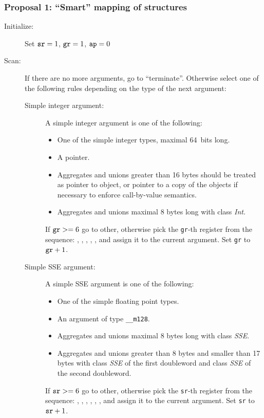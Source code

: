 \subsubsection {Proposal 1: ``Smart'' mapping of structures}

\begin{description}
  \item[Initialize:]
    Set $\verb|sr|=1$, $\verb|gr|=1$, $\verb|ap|=0$


  \item[Scan:]
    If there are no more arguments, go to ``terminate''. Otherwise select one of the
    following rules depending on the type of the next argument:
      \begin{description}
        \item[Simple integer argument:]
          A simple integer argument is one of the following:
          \begin{itemize}
            \item One of the simple integer types, maximal 64~bits long.
            \item A pointer.
            \item Aggregates and unions greater than 16 bytes should
              be treated as pointer to object, or pointer to a copy of
              the objects if necessary to enforce call-by-value
              semantics.
            \item Aggregates and unions maximal 8 bytes long with
              class \emph{Int}.
          \end{itemize}
        If $\verb|gr| >= 6$ go to other, otherwise pick the \verb|gr|-th register from
        the sequence: \RAX, \RDX, \RCX, \RBX, \RSI, \RDI{} and assign it to the current
        argument. Set \verb|gr| to $\verb|gr|+1$.


    \item[Simple SSE argument:]
      A simple SSE argument is one of the following:
      \begin{itemize}
        \item One of the simple floating point types.
        \item An argument of type \verb|__m128|.
        \item Aggregates and unions maximal 8 bytes long with class \emph{SSE}.
        \item Aggregates and unions greater than 8 bytes and smaller
          than 17 bytes with class  \emph{SSE} of the first doubleword
          and class \emph{SSE} of the second doubleword.
      \end{itemize}
      If $\verb|sr| >= 6$ go to other, otherwise pick the \verb|sr|-th
      register from the sequence: , , ,
      , , ,  and assign it to
      the current argument.  Set \verb|sr| to $\verb|sr|+1$.


\end{description}
\end{description}

